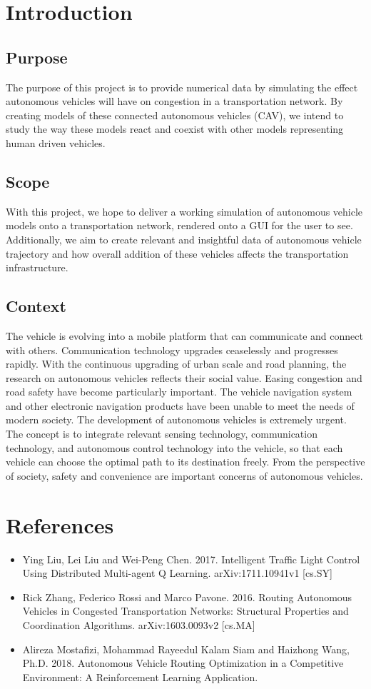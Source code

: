 \documentclass[onecolumn, draftclsnofoot,10pt, compsoc]{IEEEtran}
\begin{document}
\section{Introduction}
\subsection{Purpose}
The purpose of this project is to provide numerical data by simulating the effect autonomous vehicles will have on congestion in a transportation network.
By creating models of these connected autonomous vehicles (CAV), we intend to study the way these models react and coexist with other models representing human driven vehicles.
\subsection{Scope}
With this project, we hope to deliver a working simulation of autonomous vehicle models onto a transportation network, rendered onto a GUI for the user to see.
Additionally, we aim to create relevant and insightful data of autonomous vehicle trajectory and how overall addition of these vehicles affects the transportation infrastructure.
\subsection{Context}
The vehicle is evolving into a mobile platform that can communicate and connect with others.
Communication technology upgrades ceaselessly and progresses rapidly.
With the continuous upgrading of urban scale and road planning, the research on autonomous vehicles reflects their social value.
Easing congestion and road safety have become particularly important.
The vehicle navigation system and other electronic navigation products have been unable to meet the needs of modern society.
The development of autonomous vehicles is extremely urgent.
The concept is to integrate relevant sensing technology, communication technology, and autonomous control technology into the vehicle, so that each vehicle can choose the optimal path to its destination freely.
From the perspective of society, safety and convenience are important concerns of autonomous vehicles.
\section{References}
\begin{itemize}
\item Ying Liu, Lei Liu and Wei-Peng Chen. 2017. Intelligent Traffic Light Control Using Distributed Multi-agent Q Learning. arXiv:1711.10941v1 [cs.SY]
\item Rick Zhang, Federico Rossi and Marco Pavone. 2016. Routing Autonomous Vehicles in Congested Transportation Networks: Structural Properties and Coordination Algorithms. arXiv:1603.0093v2 [cs.MA]
\item Alireza Mostafizi, Mohammad Rayeedul Kalam Siam and Haizhong Wang, Ph.D. 2018.  Autonomous Vehicle Routing Optimization in a Competitive Environment: A Reinforcement Learning Application.
\end{itemize}
\end{document}
